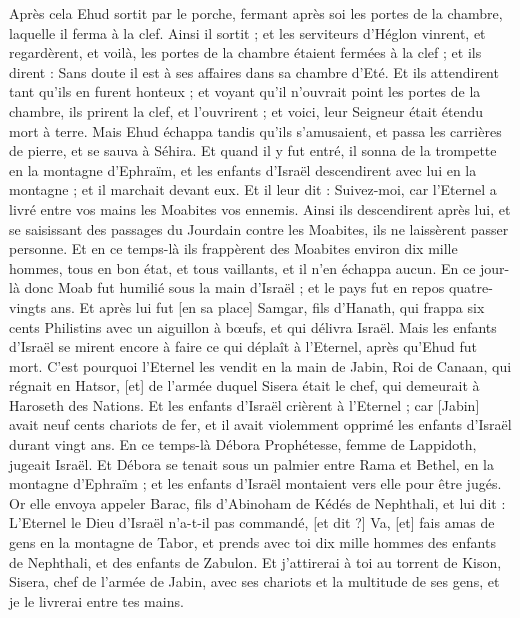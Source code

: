 \begin{multicols}{2}
Après cela Ehud sortit par le porche, fermant après soi les portes de la chambre, laquelle il ferma à la clef.
Ainsi il sortit ; et les serviteurs d'Héglon vinrent, et regardèrent, et voilà, les portes de la chambre étaient fermées à la clef ; et ils dirent : Sans doute il est à ses affaires dans sa chambre d'Eté.
Et ils attendirent tant qu'ils en furent honteux ; et voyant qu'il n'ouvrait point les portes de la chambre, ils prirent la clef, et l'ouvrirent ; et voici, leur Seigneur était étendu mort à terre.
Mais Ehud échappa tandis qu'ils s'amusaient, et passa les carrières de pierre, et se sauva à Séhira.
Et quand il y fut entré, il sonna de la trompette en la montagne d'Ephraïm, et les enfants d'Israël descendirent avec lui en la montagne ; et il marchait devant eux.
Et il leur dit : Suivez-moi, car l'Eternel a livré entre vos mains les Moabites vos ennemis. Ainsi ils descendirent après lui, et se saisissant des passages du Jourdain contre les Moabites, ils ne laissèrent passer personne.
Et en ce temps-là ils frappèrent des Moabites environ dix mille hommes, tous en bon état, et tous vaillants, et il n'en échappa aucun.
En ce jour-là donc Moab fut humilié sous la main d'Israël ; et le pays fut en repos quatre-vingts ans.
Et après lui fut [en sa place] Samgar, fils d'Hanath, qui frappa six cents Philistins avec un aiguillon à bœufs, et qui délivra Israël.
\VerseOne{}Mais les enfants d'Israël se mirent encore à faire ce qui déplaît à l'Eternel, après qu'Ehud fut mort.
C'est pourquoi l'Eternel les vendit en la main de Jabin, Roi de Canaan, qui régnait en Hatsor, [et] de l'armée duquel Sisera était le chef, qui demeurait à Haroseth des Nations.
Et les enfants d'Israël crièrent à l'Eternel ; car [Jabin] avait neuf cents chariots de fer, et il avait violemment opprimé les enfants d'Israël durant vingt ans.
En ce temps-là Débora Prophétesse, femme de Lappidoth, jugeait Israël.
Et Débora se tenait sous un palmier entre Rama et Bethel, en la montagne d'Ephraïm ; et les enfants d'Israël montaient vers elle pour être jugés.
Or elle envoya appeler Barac, fils d'Abinoham de Kédés de Nephthali, et lui dit : L'Eternel le Dieu d'Israël n'a-t-il pas commandé, [et dit ?] Va, [et] fais amas de gens en la montagne de Tabor, et prends avec toi dix mille hommes des enfants de Nephthali, et des enfants de Zabulon.
Et j'attirerai à toi au torrent de Kison, Sisera, chef de l'armée de Jabin, avec ses chariots et la multitude de ses gens, et je le livrerai entre tes mains.

\end{multicols}
